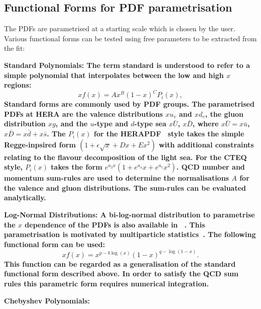 \subsection{Functional Forms for PDF parametrisation}
The PDFs are parametrised at a starting scale which is chosen by the user. Various functional forms can be tested using free parameters to be extracted from the fit:
\begin{description}
\item \bf {Standard Polynomials:} \rm
The term standard is understood to refer to a simple polynomial 
that interpolates between the low and high $x$ regions:
\begin{equation}
 xf(x) = A x^{B} (1-x)^{C} P_i(x),
\label{eqn:pdf_std}
\end{equation}
Standard forms are commonly used by PDF groups.
The parametrised PDFs at HERA are the valence distributions
$xu_v$ and $xd_v$, the gluon distribution $xg$, and the $u$-type and $d$-type sea 
$x\bar{U}$, $x\bar{D}$, where $x\bar{U} = x\bar{u}$, 
$x\bar{D} = x\bar{d} +x\bar{s}$. 
The $P_i(x)$ for the HERAPDF~\cite{h1zeus:2009wt} style takes the simple Regge-inpsired form  
$(1 + \epsilon \sqrt{x} + D x + E x^2)$
with additional constraints relating to the flavour decomposition of the 
light sea. 
For the CTEQ style, $P_i(x)$ takes the form $e^{a_3x} (1 + e^{a_4} x + e^{a_5} x^2)$.
QCD number and momentum sum-rules are used to determine the normalisations $A$ for the valence and gluon distributions. 
The sum-rules can be evaluated analytically.

\item \bf {Log-Normal Distributions:} \rm
A bi-log-normal distribution to parametrise the $x$ dependence of the PDFs is 
also available in \fitter\ .
This parametrisation is motivated by  multiparticle statistics~\cite{hera-lhc:report2009}. 
The following functional form can be used:
\begin{equation}
 xf(x)=x^{p-b\log(x)}(1-x)^{q-\log(1-x)}.
\end{equation}
This function can be regarded as a generalisation of the standard functional form described above. 
In order to satisfy the QCD sum rules this parametric form requires numerical integration.

\item \bf {Chebyshev Polynomials:} \rm


\end{description}
